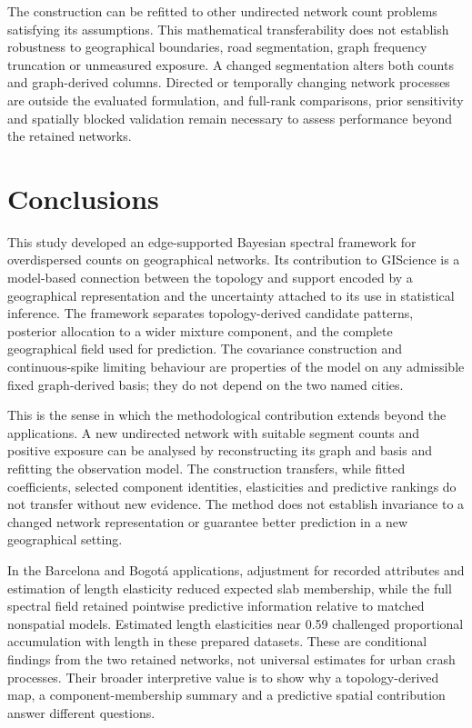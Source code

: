 \documentclass[11pt]{article}
\begin{document}
The construction can be refitted to other undirected network count problems satisfying its assumptions. This mathematical transferability does not establish robustness to geographical boundaries, road segmentation, graph frequency truncation or unmeasured exposure. A changed segmentation alters both counts and graph-derived columns. Directed or temporally changing network processes are outside the evaluated formulation, and full-rank comparisons, prior sensitivity and spatially blocked validation remain necessary to assess performance beyond the retained networks.

\section{Conclusions}
This study developed an edge-supported Bayesian spectral framework for overdispersed counts on geographical networks. Its contribution to GIScience is a model-based connection between the topology and support encoded by a geographical representation and the uncertainty attached to its use in statistical inference. The framework separates topology-derived candidate patterns, posterior allocation to a wider mixture component, and the complete geographical field used for prediction. The covariance construction and continuous-spike limiting behaviour are properties of the model on any admissible fixed graph-derived basis; they do not depend on the two named cities.

This is the sense in which the methodological contribution extends beyond the applications. A new undirected network with suitable segment counts and positive exposure can be analysed by reconstructing its graph and basis and refitting the observation model. The construction transfers, while fitted coefficients, selected component identities, elasticities and predictive rankings do not transfer without new evidence. The method does not establish invariance to a changed network representation or guarantee better prediction in a new geographical setting.

In the Barcelona and Bogot\'a applications, adjustment for recorded attributes and estimation of length elasticity reduced expected slab membership, while the full spectral field retained pointwise predictive information relative to matched nonspatial models. Estimated length elasticities near 0.59 challenged proportional accumulation with length in these prepared datasets. These are conditional findings from the two retained networks, not universal estimates for urban crash processes. Their broader interpretive value is to show why a topology-derived map, a component-membership summary and a predictive spatial contribution answer different questions.
\end{document}
